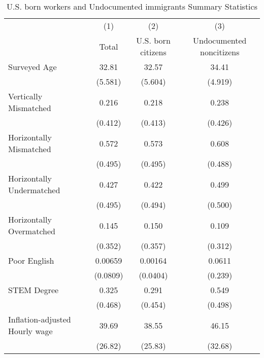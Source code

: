 \begin{table}[htbp]\centering
\def\sym#1{\ifmmode^{#1}\else\(^{#1}\)\fi}
\caption{U.S. born workers and Undocumented immigrants Summary Statistics \label{tab:sum}}
\begin{tabular}{l*{3}{c}}
\hline\hline
                    &\multicolumn{1}{c}{(1)}         &\multicolumn{1}{c}{(2)}         &\multicolumn{1}{c}{(3)}         \\
                    &       Total         &U.S. born citizens         &Undocumented noncitizens         \\
\hline
Surveyed Age        &       32.81         &       32.57         &       34.41         \\
                    &     (5.581)         &     (5.604)         &     (4.919)         \\
[1em]
Vertically Mismatched&       0.216         &       0.218         &       0.238         \\
                    &     (0.412)         &     (0.413)         &     (0.426)         \\
[1em]
Horizontally Mismatched&       0.572         &       0.573         &       0.608         \\
                    &     (0.495)         &     (0.495)         &     (0.488)         \\
[1em]
Horizontally Undermatched&       0.427         &       0.422         &       0.499         \\
                    &     (0.495)         &     (0.494)         &     (0.500)         \\
[1em]
Horizontally Overmatched&       0.145         &       0.150         &       0.109         \\
                    &     (0.352)         &     (0.357)         &     (0.312)         \\
[1em]
Poor English        &     0.00659         &     0.00164         &      0.0611         \\
                    &    (0.0809)         &    (0.0404)         &     (0.239)         \\
[1em]
STEM Degree         &       0.325         &       0.291         &       0.549         \\
                    &     (0.468)         &     (0.454)         &     (0.498)         \\
[1em]
Inflation-adjusted Hourly wage&       39.69         &       38.55         &       46.15         \\
                    &     (26.82)         &     (25.83)         &     (32.68)         \\

\end{tabular}
\end{table}
